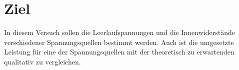 \section{Ziel}
In diesem Versuch sollen die Leerlaufspannungen und die Innenwiderstände
verschiedener Spannungsquellen bestimmt werden. Auch ist die umgesetzte Leistung
für eine der Spannungsquellen mit der theoretisch zu erwartenden qualitativ zu
vergleichen.
\label{sec:Ziel}
